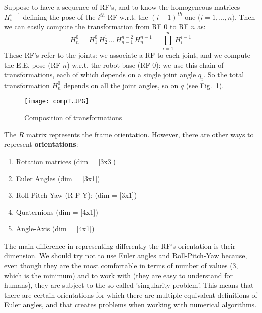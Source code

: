                     Suppose to have a sequence of RF's, and to know the homogeneous matrices $H^{i-1}_{i}$ defining the pose of the $i^{th}$ RF w.r.t. the $(i-1)^{th}$ one ($i = 1, ..., n)$. Then we can easily compute the transformation from RF $0$ to RF $n$ as:
                    $$
                    H^{0}_{n} = H^{0}_{1} \, H^{1}_{2} \, ... \, H^{n-2}_{n-1} \, H^{n-1}_{n} = \prod_{i=1}^{n} H^{i-1}_{i}
                    $$
                    These RF's refer to the joints: we associate a RF to each joint, and we compute the E.E. pose (RF $n$) w.r.t. the robot base (RF $0$): we use this chain of transformations, each of which depends on a single joint angle $q_i$. So the total transformation $H^{0}_{n}$ depends on all the joint angles, so on $q$ (see Fig.~\ref{fig:forward_geometry}).
                                
                    \begin{figure}[t]    
                        \texttt{[image: compT.JPG]}
                        \caption{Composition of transformations}
                        \label{fig:forward_geometry}
                    \end{figure}
                    
                    The $R$ matrix represents the frame orientation. However, there are other ways to represent \textbf{orientations}:
                    \begin{enumerate}
                        \item Rotation matrices (dim = [3x3])
                        \item Euler Angles (dim = [3x1])
                        \item Roll-Pitch-Yaw (R-P-Y): (dim = [3x1])
                        \item Quaternions (dim = [4x1])
                        \item Angle-Axis (dim = [4x1])
                    \end{enumerate}
                    The main difference in representing differently the RF's orientation is their dimension.
                    We should try not to use Euler angles and Roll-Pitch-Yaw because, even though they are the most comfortable in terms of number of values (3, which is the minimum) and to work with (they are easy to understand for humans), they are subject to the so-called 'singularity problem'. This means that there are certain orientations for which there are multiple equivalent definitions of Euler angles, and that creates problems when working with numerical algorithms.                    
                    
